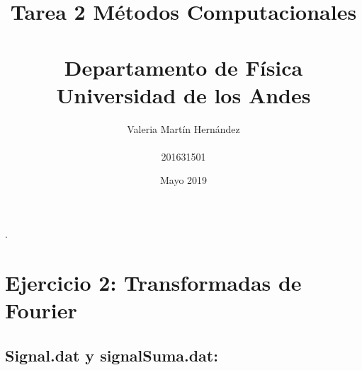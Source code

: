 \documentclass[11pt,letterpaper]{exam}
\title{Tarea 2 Métodos Computacionales\\\\ Departamento de Física \\ Universidad de los Andes}
\author{Valeria Martín Hernández\\\\201631501}
\date{Mayo 2019}
\begin{document}
\maketitle
.\newline\newline\newline\newline\newline\newline\newline\newline\newline\newline\newline\newline\newline\newline\newline\newline\newline\newline\newline\newline\newline\newline\newline\newline\newline\newline

\maketitle

\section{Ejercicio 2: Transformadas de Fourier}
\subsection{Signal.dat y signalSuma.dat:}
\end{document}

